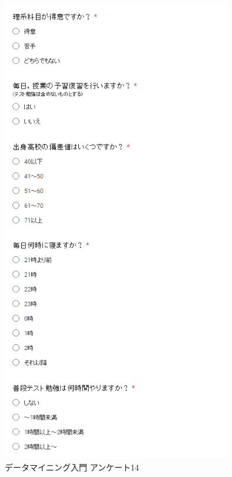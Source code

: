 \begin{figure}[p]
\centering
\includegraphics[width=10cm]{forms14.PNG}
\caption{データマイニング入門 アンケート14}\label{サンプル図}
\end{figure}


